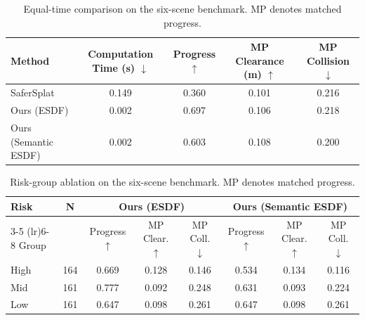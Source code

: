 \begin{table}[t]
\centering
\caption{\small Equal-time comparison on the six-scene benchmark. MP denotes matched progress.}
\label{tab:sim_3methods}
\begin{tabular}{lcccc}
\toprule
Method & Computation Time (s) $\downarrow$ & Progress $\uparrow$ & MP Clearance (m) $\uparrow$ & MP Collision $\downarrow$ \\
\midrule
SaferSplat & 0.149 & 0.360 & 0.101 & 0.216 \\
Ours (ESDF) & 0.002 & 0.697 & 0.106 & 0.218 \\
Ours (Semantic ESDF) & 0.002 & 0.603 & 0.108 & 0.200 \\
\bottomrule
\end{tabular}
\end{table}

\begin{table}[t]
\centering
\caption{\small Risk-group ablation on the six-scene benchmark. MP denotes matched progress.}
\label{tab:risk_ablation}
\begin{tabular}{lccccccc}
\toprule
Risk & N & \multicolumn{3}{c}{Ours (ESDF)} & \multicolumn{3}{c}{Ours (Semantic ESDF)} \\
\cmidrule(lr){3-5} \cmidrule(lr){6-8}
Group & & Progress $\uparrow$ & MP Clear. $\uparrow$ & MP Coll. $\downarrow$ & Progress $\uparrow$ & MP Clear. $\uparrow$ & MP Coll. $\downarrow$ \\
\midrule
High & 164 & 0.669 & 0.128 & 0.146 & 0.534 & 0.134 & 0.116 \\
Mid & 161 & 0.777 & 0.092 & 0.248 & 0.631 & 0.093 & 0.224 \\
Low & 161 & 0.647 & 0.098 & 0.261 & 0.647 & 0.098 & 0.261 \\
\bottomrule
\end{tabular}
\end{table}
